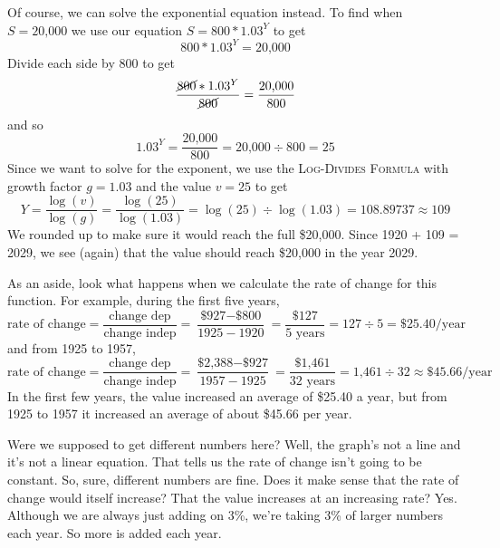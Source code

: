 Of course, we can solve the exponential equation instead. To find when $S= \text{20,000}$ we use our equation $S = 800 \ast 1.03^Y$ to get 
$$800 \ast 1.03^Y =  \text{20,000} $$
Divide each side by 800 to get
$$ \frac{\cancel{800} \ast 1.03^Y}{\cancel{800}} = \frac{ \text{20,000}}{800} $$
and so $$1.03^Y = \frac{ \text{20,000}}{800}  =  \text{20,000} \div {800} = 25$$
Since we want to solve for the exponent, we use the \textsc{Log-Divides Formula} with growth factor $g=1.03$ and the value $v= 25$ to get
$$Y =  \frac{\log (v)}{\log(g)} =  \frac{\log (25)}{\log(1.03)} = \log (25) \div \log (1.03) = 108.89737 \approx 109  $$
We rounded up to make sure it would reach the full \$20,000.  Since 1920 + 109 = 2029, we see (again) that the value should reach \$20,000 in the year 2029.

As an aside, look what happens when we calculate the rate of change for this function.  For example, during the first five years, 
$$\text{rate of change} =  \frac{\text{change dep}}{\text{change indep}} = \frac{\text{\$927} - \text{\$800}}{1925-1920}= \frac{\$127}{5 \text{ years}} = 127 \div 5 = \$25.40\text{/year}$$
and from 1925 to 1957, 
$$\text{rate of change} =  \frac{\text{change dep}}{\text{change indep}} = \frac{\text{\$2,388} - \text{\$927}}{1957-1925}= \frac{\$\text{1,461}}{32 \text{ years}} = \text{1,461} \div 32 \approx \$45.66\text{/year}$$
In the first few years, the value increased an average of \$25.40 a year, but from 1925 to 1957 it increased an average of about \$45.66 per year.

Were we supposed to get different numbers here?  Well, the graph's not a line and it's not a linear equation.  That tells us the rate of change isn't going to be constant.  So, sure, different numbers are fine.  Does it make sense that the rate of change would itself increase?  That the value increases at an increasing rate? Yes. Although we are always just adding on 3\%, we're taking 3\% of larger numbers each year.  So more is added each year.  

 